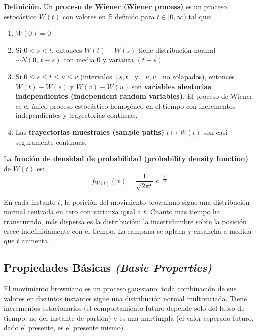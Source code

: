 \documentclass[12pt]{article}
\begin{document}
\textbf{Definici\'on.} Un \textbf{proceso de Wiener (Wiener process)} es un proceso estoc\'astico $W(t)$ con valores en $\mathbb{R}$ definido para $t \in [0,\infty)$ tal que:
\begin{enumerate}
  \item $W(0) = 0$
  \item Si $0 < s < t$, entonces $W(t) - W(s)$ tiene distribuci\'on normal $\sim N(0,\, t-s)$ con media 0 y varianza $(t-s)$
  \item Si $0 \leq s \leq t \leq u \leq v$ (intervalos $[s,t]$ y $[u,v]$ no solapados), entonces $W(t)-W(s)$ y $W(v)-W(u)$ son \textbf{variables aleatorias independientes (independent random variables)}. El proceso de Wiener es el \'unico proceso estoc\'astico homog\'eneo en el tiempo con incrementos independientes y trayectorias continuas.
  \item Las \textbf{trayectorias muestrales (sample paths)} $t \mapsto W(t)$ son casi seguramente continuas.
\end{enumerate}

La \textbf{funci\'on de densidad de probabilidad (probability density function)} de $W(t)$ es:
\begin{equation}
  f_{W(t)}(x) = \frac{1}{\sqrt{2\pi t}}\; e^{-\frac{x^2}{2t}}
\end{equation}

\begin{intuicionmat}
En cada instante $t$, la posici\'on del movimiento browniano sigue una distribuci\'on normal centrada en cero con varianza igual a $t$. Cuanto m\'as tiempo ha transcurrido, m\'as dispersa es la distribuci\'on: la incertidumbre sobre la posici\'on crece indefinidamente con el tiempo. La campana se aplana y ensancha a medida que $t$ aumenta.
\end{intuicionmat}

\subsection{Propiedades B\'asicas \textit{(Basic Properties)}}

\begin{intuicion}
El movimiento browniano es un proceso gaussiano: toda combinaci\'on de sus valores en distintos instantes sigue una distribuci\'on normal multivariada. Tiene incrementos estacionarios (el comportamiento futuro depende solo del lapso de tiempo, no del instante de partida) y es una martingala (el valor esperado futuro, dado el presente, es el presente mismo).
\end{intuicion}
\end{document}

